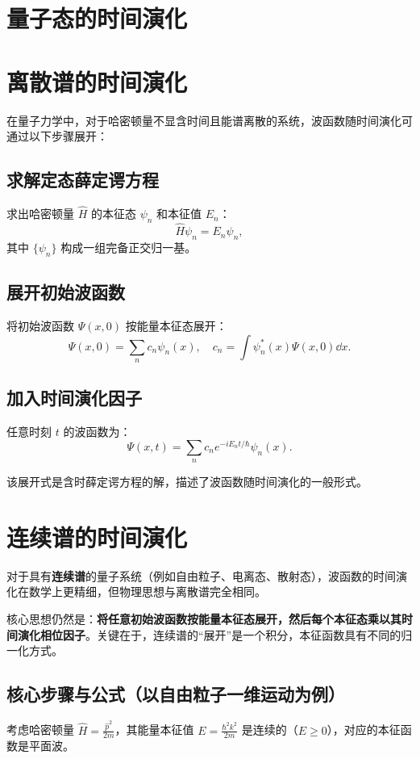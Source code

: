 \section{量子态的时间演化}
\section*{离散谱的时间演化}
在量子力学中，对于哈密顿量不显含时间且能谱离散的系统，波函数随时间演化可通过以下步骤展开：

\subsection{求解定态薛定谔方程}
求出哈密顿量 \(\hat{H}\) 的本征态 \(\psi_n\) 和本征值 \(E_n\)：
\[
\hat{H} \psi_n = E_n \psi_n,
\]
其中 \(\{\psi_n\}\) 构成一组完备正交归一基。

\subsection{展开初始波函数}
将初始波函数 \(\Psi(x,0)\) 按能量本征态展开：
\[
\Psi(x,0) = \sum_n c_n \psi_n(x), \quad c_n = \int \psi_n^*(x) \Psi(x,0)  \dd{x}.
\]

\subsection{加入时间演化因子}
任意时刻 \(t\) 的波函数为：
\[
\Psi(x,t) = \sum_n c_n e^{-i E_n t / \hbar} \psi_n(x).
\]

该展开式是含时薛定谔方程的解，描述了波函数随时间演化的一般形式。

\section*{连续谱的时间演化}

对于具有\textbf{连续谱}的量子系统（例如自由粒子、电离态、散射态），波函数的时间演化在数学上更精细，但物理思想与离散谱完全相同。

核心思想仍然是：\textbf{将任意初始波函数按能量本征态展开，然后每个本征态乘以其时间演化相位因子}。关键在于，连续谱的“展开”是一个积分，本征函数具有不同的归一化方式。

\subsection{核心步骤与公式（以自由粒子一维运动为例）}

考虑哈密顿量 \(\displaystyle \hat{H} = \frac{\hat{p}^2}{2m}\)，其能量本征值 \(\displaystyle E = \frac{\hbar^2 k^2}{2m}\) 是连续的（\(E \ge 0\)），对应的本征函数是平面波。

